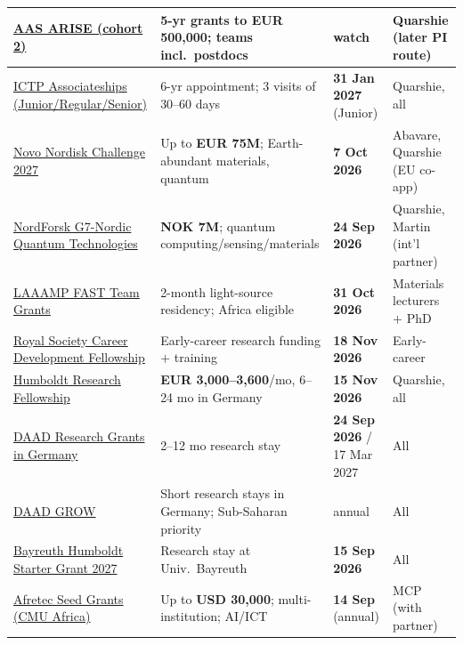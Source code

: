 \documentclass[11pt,a4paper]{article}
\begin{document}
\begin{longtable}{@{}p{3.4cm}p{5.6cm}p{2.2cm}p{2.7cm}@{}}
\midrule
\href{https://arise.aasciences.africa/}{AAS ARISE (cohort 2)} & 5-yr grants to \textbf{EUR 500{,}000}; teams incl.\ postdocs & watch & Quarshie (later PI route) \\
\midrule
\href{https://www.ictp.it/home/associates-programme}{ICTP Associateships (Junior/Regular/Senior)} & 6-yr appointment; 3 visits of 30--60 days & \textbf{31 Jan 2027} (Junior) & Quarshie, all \\
\midrule
\href{https://ogr.knust.edu.gh/funding/novo-nordisk-foundation-challenge-programme-2027-harnessing-novel-earth-abundant-materials}{Novo Nordisk Challenge 2027} & Up to \textbf{EUR 75M}; Earth-abundant materials, quantum & \textbf{7 Oct 2026} & Abavare, Quarshie (EU co-app) \\
\midrule
\href{https://www2.fundsforngos.org/science/applications-open-for-quantum-technologies-funding-program/}{NordForsk G7-Nordic Quantum Technologies} & \textbf{NOK 7M}; quantum computing/sensing/materials & \textbf{24 Sep 2026} & Quarshie, Martin (int'l partner) \\
\midrule
\href{https://laamp.iucr.org/grants/calls/jan-dec-2027}{LAAAMP FAST Team Grants} & 2-month light-source residency; Africa eligible & \textbf{31 Oct 2026} & Materials lecturers $+$ PhD \\
\midrule
\href{https://royalsociety.org/grants/career-development-fellowship/}{Royal Society Career Development Fellowship} & Early-career research funding $+$ training & \textbf{18 Nov 2026} & Early-career \\
\midrule
\href{https://www.humboldt-foundation.de/en/apply/sponsorship-programmes/humboldt-research-fellowship}{Humboldt Research Fellowship} & \textbf{EUR 3{,}000--3{,}600}/mo, 6--24 mo in Germany & \textbf{15 Nov 2026} & Quarshie, all \\
\midrule
\href{https://www2.daad.de/deutschland/stipendium/datenbank/en/21148-scholarship-database/?detail=57742121}{DAAD Research Grants in Germany} & 2--12 mo research stay & \textbf{24 Sep 2026} / 17 Mar 2027 & All \\
\midrule
\href{https://www.daad-kenya.org/en/call-for-proposals-applications/}{DAAD GROW} & Short research stays in Germany; Sub-Saharan priority & annual & All \\
\midrule
\href{https://www.humboldt-centre.uni-bayreuth.de/en/applications/index.php}{Bayreuth Humboldt Starter Grant 2027} & Research stay at Univ.\ Bayreuth & \textbf{15 Sep 2026} & All \\
\midrule
\href{https://engineering.cmu.edu/afretec/funding-opportunities/index.html}{Afretec Seed Grants (CMU Africa)} & Up to \textbf{USD 30{,}000}; multi-institution; AI/ICT & \textbf{14 Sep} (annual) & MCP (with partner) \\

\end{longtable}
\end{document}
